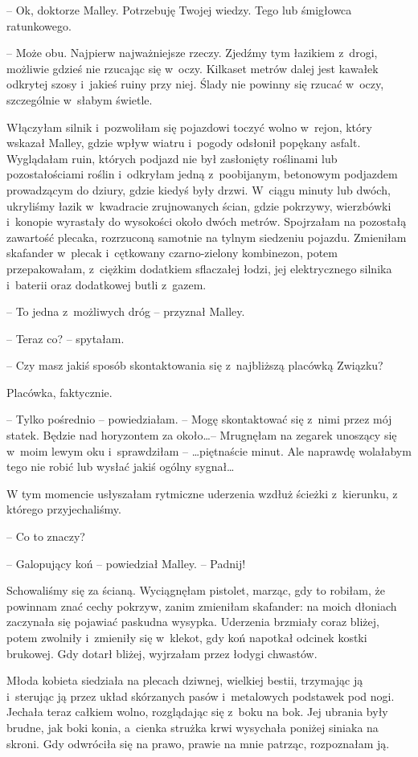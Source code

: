 \documentclass[oneside,polish,11pt,sfheadings]{mwbk}
\begin{document}
-- Ok, doktorze Malley. Potrzebuję Twojej wiedzy.
Tego lub śmigłowca ratunkowego.

-- Może obu. Najpierw najważniejsze rzeczy. Zjedźmy tym łazikiem z~drogi,
możliwie gdzieś nie rzucając się w~oczy. Kilkaset metrów dalej jest
kawałek odkrytej szosy i~jakieś ruiny przy niej. Ślady nie powinny się
rzucać w~oczy, szczególnie w~słabym świetle.

Włączyłam silnik i~pozwoliłam się pojazdowi toczyć wolno w~rejon, który
wskazał Malley, gdzie wpływ wiatru i~pogody odsłonił popękany asfalt.
Wyglądałam ruin, których podjazd nie był zasłonięty roślinami lub
pozostałościami roślin i~odkryłam jedną z~poobijanym, betonowym
podjazdem prowadzącym do dziury, gdzie kiedyś były drzwi. W~ciągu minuty
lub dwóch, ukryliśmy łazik w~kwadracie zrujnowanych ścian, gdzie
pokrzywy, wierzbówki i~konopie wyrastały do wysokości około dwóch
metrów. Spojrzałam na pozostałą zawartość plecaka, rozrzuconą samotnie
na tylnym siedzeniu pojazdu. Zmieniłam skafander w~plecak i~cętkowany
czarno-zielony kombinezon, potem przepakowałam, z~ciężkim dodatkiem
sflaczałej łodzi, jej elektrycznego silnika i~baterii oraz dodatkowej
butli z~gazem.

-- To jedna z~możliwych dróg -- przyznał Malley.

-- Teraz co? -- spytałam.

-- Czy masz jakiś sposób skontaktowania się z~najbliższą placówką
Związku?

Placówka, faktycznie. 

-- Tylko pośrednio -- powiedziałam. -- Mogę
skontaktować się z~nimi przez mój statek. Będzie nad horyzontem za
około\ldots  -- Mrugnęłam na zegarek unoszący się w~moim lewym oku i~sprawdziłam -- \ldots  piętnaście minut. Ale naprawdę wolałabym tego nie
robić lub wysłać jakiś ogólny sygnał\ldots 

W tym momencie usłyszałam rytmiczne uderzenia wzdłuż ścieżki z~kierunku,
z którego przyjechaliśmy.

-- Co to znaczy?

-- Galopujący koń -- powiedział Malley. -- Padnij!

Schowaliśmy się za ścianą. Wyciągnęłam pistolet, marząc, gdy to robiłam,
że powinnam znać cechy pokrzyw, zanim zmieniłam skafander: na moich
dłoniach zaczynała się pojawiać paskudna wysypka. Uderzenia brzmiały
coraz bliżej, potem zwolniły i~zmieniły się w~klekot, gdy koń napotkał
odcinek kostki brukowej. Gdy dotarł bliżej, wyjrzałam przez łodygi
chwastów.

Młoda kobieta siedziała na plecach dziwnej, wielkiej bestii, trzymając
ją i~sterując ją przez układ skórzanych pasów i~metalowych podstawek pod
nogi. Jechała teraz całkiem wolno, rozglądając się z~boku na bok. Jej
ubrania były brudne, jak boki konia, a~cienka strużka krwi wysychała
poniżej siniaka na skroni. Gdy odwróciła się na prawo, prawie na mnie
patrząc, rozpoznałam ją.
\end{document}
